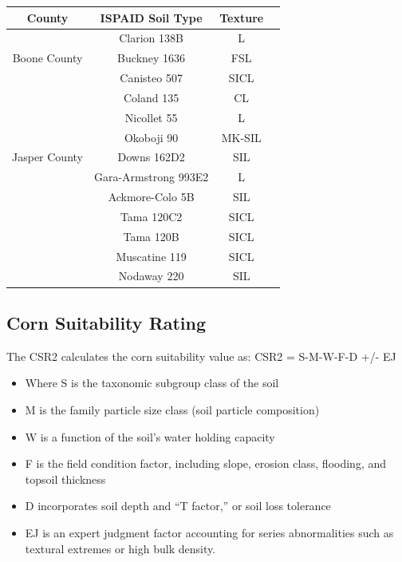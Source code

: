 \documentclass[11pt]{article}
\begin{document}
\begin{center}
\begin{tabular}{ |c|c|c|c| } 
\hline
County & ISPAID Soil Type & Texture \\
\hline
\multirow{3}{7em}{Boone County} & Clarion 138B & L \\ 
& Buckney 1636 & FSL \\ 
& Canisteo 507 & SICL \\ 
& Coland 135   & CL  \\
& Nicollet 55  & L   \\
& Okoboji 90   & MK-SIL \\
\hline
Jasper County & Downs 162D2 & SIL \\
& Gara-Armstrong 993E2 & L \\
& Ackmore-Colo 5B & SIL\\
& Tama 120C2 & SICL \\
& Tama 120B  & SICL \\
& Muscatine 119 & SICL \\
& Nodaway 220 & SIL \\
\hline
\end{tabular}
\end{center}
\subsection{Corn Suitability Rating}
The CSR2 calculates the corn suitability value as:
CSR2 = S-M-W-F-D +/- EJ
\begin{itemize}
\item Where S is the taxonomic subgroup class of the soil 
\item M is the family particle size class (soil particle composition)
\item W is a function of the soil’s water holding capacity
\item F is the field condition factor, including slope, erosion class, flooding, and topsoil thickness
\item D incorporates soil depth and “T factor,” or soil loss tolerance
\item EJ is an expert judgment factor accounting for series abnormalities such as textural extremes or high bulk density.\cite{32} 
\end{itemize}

\newpage
\end{document}
